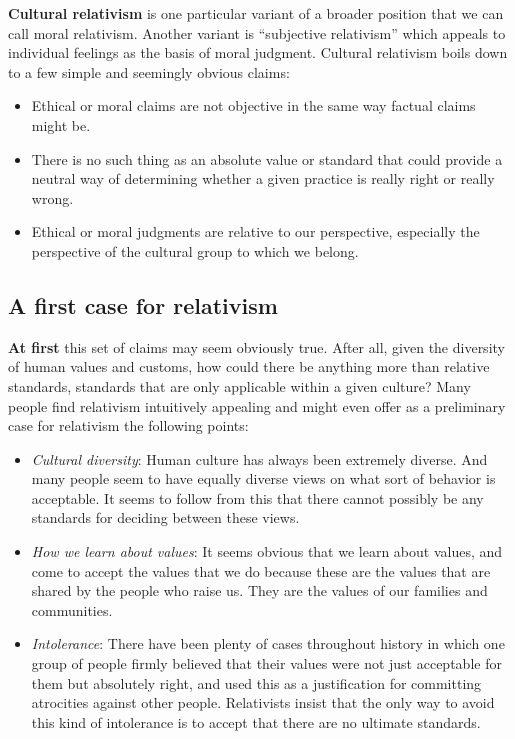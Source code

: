 \documentclass[]{book}
\providecommand{\tightlist}{%
  \setlength{\itemsep}{0pt}\setlength{\parskip}{0pt}}
\begin{document}
\textbf{Cultural relativism} is one particular variant of a broader position that we can call moral relativism. Another variant is ``subjective relativism'' which appeals to individual feelings as the basis of moral judgment. Cultural relativism boils down to a few simple and seemingly obvious claims:

\begin{itemize}
\tightlist
\item
  Ethical or moral claims are not objective in the same way factual claims might be.
\item
  There is no such thing as an absolute value or standard that could provide a neutral way of determining whether a given practice is really right or really wrong.
\item
  Ethical or moral judgments are relative to our perspective, especially the perspective of the cultural group to which we belong.
\end{itemize}

\hypertarget{a-first-case-for-relativism}{%
\subsection*{A first case for relativism}\label{a-first-case-for-relativism}}


\textbf{At first} this set of claims may seem obviously true. After all, given the diversity of human values and customs, how could there be anything more than relative standards, standards that are only applicable within a given culture? Many people find relativism intuitively appealing and might even offer as a preliminary case for relativism the following points:

\begin{itemize}
\tightlist
\item
  \emph{Cultural diversity}: Human culture has always been extremely diverse. And many people seem to have equally diverse views on what sort of behavior is acceptable. It seems to follow from this that there cannot possibly be any standards for deciding between these views.
\item
  \emph{How we learn about values}: It seems obvious that we learn about values, and come to accept the values that we do because these are the values that are shared by the people who raise us. They are the values of our families and communities.
\item
  \emph{Intolerance}: There have been plenty of cases throughout history in which one group of people firmly believed that their values were not just acceptable for them but absolutely right, and used this as a justification for committing atrocities against other people. Relativists insist that the only way to avoid this kind of intolerance is to accept that there are no ultimate standards.
\end{itemize}
\end{document}
